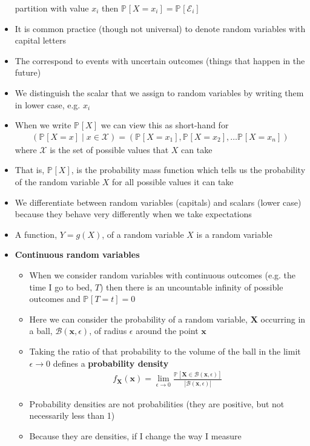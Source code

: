 \documentclass[11pt]{article}
\newcommand{\Prob}[2][]{\mathbb{P}_{#1\!}\left[ #2 \right]}
\newcommand{\bra}[1]{\left( #1 \right)}
\begin{document}
\begin{itemize}
partition with value \(x_i\) then \(\Prob{X=x_i} = \Prob{\mathcal{E}_i}\)
\item It is common practice (though not universal) to denote random
variables with capital letters
\item The correspond to events with uncertain outcomes (things that
happen in the future)
\item We distinguish the scalar that we assign to random variables by
writing them in lower case, e.g. \(x_{i}\)
\item When we write \(\Prob{X}\) we can view this as short-hand for
\begin{align*}
  \bra{\Prob{X=x} \mid x \in \mathcal{X}}
  = \bra{\Prob{X=x_1}, \Prob{X=x_2},\ldots\Prob{X=x_n}}
\end{align*}
where \(\mathcal{X}\) is the set of possible values that \(X\)
can take
\item That is, \(\Prob{X}\), is the probability mass function which tells
us the probability of the random variable \(X\) for all possible
values it can take
\item We differentiate between random variables (capitals) and scalars
(lower case) because they behave very differently when we take expectations
\item A function, \(Y=g(X)\), of a random variable \(X\) is a random
variable
\item \textbf{Continuous random variables}
\begin{itemize}
\item When we consider random variables with continuous outcomes (e.g. the
time I go to bed, \(T\)) then there is an uncountable infinity of possible
outcomes and \(\Prob{T=t}=0\)
\item Here we can consider the probability of a random variable,
\(\bm{X}\) occurring in a ball, \(\mathcal{B}(\bm{x}, \epsilon)\),
of radius \(\epsilon\) around the point \(\bm{x}\)
\item Taking the ratio of that probability to the volume of the ball
in the limit \(\epsilon\rightarrow0\) defines a \textbf{probability
density}
\begin{align*}
f_{\bm{X}}(\bm{x}) = \lim_{\epsilon\rightarrow 0}
\frac{\Prob{\bm{X}\in\mathcal{B}(\bm{x},
\epsilon)}}{|\mathcal{B}(\bm{x}, \epsilon)|}
\end{align*}
\item Probability densities are not probabilities (they are positive,
but not necessarily less than 1)
\item Because they are densities, if I change the way I measure

\end{itemize}
\end{itemize}
\end{document}
